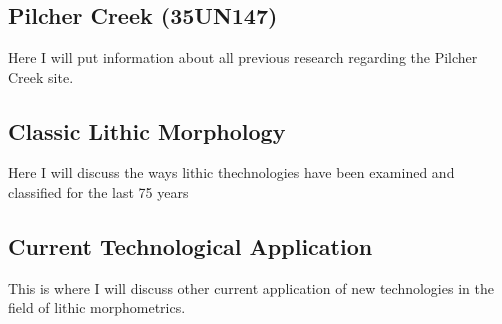 \chapter{}

\section{Pilcher Creek (35UN147)}
	Here I will put information about all previous research regarding the Pilcher Creek site.

\section{Classic Lithic Morphology}
	Here I will discuss the ways lithic thechnologies have been examined and classified for the last 75 years

\section{Current Technological Application}
	This is where I will discuss other current application of new technologies in the field of lithic morphometrics.